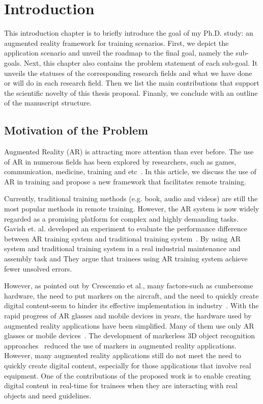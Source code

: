 \chapter{Introduction}
\label{cha:i}

This introduction chapter is to briefly introduce the goal of my Ph.D. study: an augmented reality framework for training scenarios. First, we depict the application scenario and unveil the roadmap to the final goal, namely the sub-goals.
Next, this chapter also contains the problem statement of each sub-goal. It unveils the statuses of the corresponding research fields and what we have done or will do in each research field.
Then we list the main contributions that support the scientific novelty of this thesis proposal.
Finanly, we conclude with an outline of the manuscript structure.

\section{Motivation of the Problem}
\label{sec:into:mp}

Augmented Reality (AR) is attracting more attention than ever before. The use of AR in numerous fields has been explored by researchers, such as games, communication, medicine, training and etc~\cite{nakajima2003,gonzalez-franco2016,hincapie2011,webel2011}.
In this article, we discuss the use of AR in training and propose a new framework that facilitates remote training.

Currently, traditional training methods (e.g. book, audio and videos) are still the most popular methods in remote training. However, the AR system is now widely regarded as a promising platform for complex and highly demanding tasks.
Gavish et. al. developed an experiment to evaluate the performance difference between AR training system and traditional training system~\cite{gavish2015}. By using AR system and traditional training system in a real industrial maintenance and assembly task and They argue that trainees using AR training system achieve fewer unsolved errors.

However, as pointed out by Crescenzio et al., many factors-such as cumbersome hardware, the need to put markers on the aircraft, and the need to quickly create digital content-seem to hinder its effective implementation in industry~\cite{crescenzio2011}. With the rapid progress of AR glasses and mobile devices in years, the hardware used by augmented reality applications have been simplified. Many of them use only AR glasses or mobile devices~\cite{hincapie2011,webel2011}. The development of markerless 3D object recognition approaches~\cite{tjaden2016} reduced the use of markers in augmented reality applications. However, many augmented reality applications still do not meet the need to quickly create digital content, especially for those applications that involve real equipment. One of the contributions of the proposed work is to enable creating digital content in real-time for trainees when they are interacting with real objects and need guidelines.

